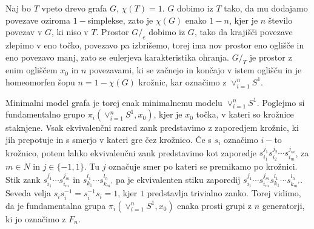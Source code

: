 \documentclass[a4paper,12pt]{article}
\theoremstyle{definition}
\theoremstyle{plain}
\theoremstyle{definition}
\theoremstyle{plain}
\theoremstyle{plain}
\theoremstyle{plain}
\theoremstyle{plain}
\begin{document}
Naj bo $T$ vpeto drevo grafa $G$, $\chi(T)=1$. $G$ dobimo iz $T$ tako, da mu dodajamo povezave 
oziroma $1-$simplekse, zato je $\chi(G)$ enako $1-n$, kjer je $n$ število povezav v $G$, ki niso v 
$T$. Prostor $G/_e$ dobimo iz $G$, tako da krajišči povezave zlepimo v eno točko, povezavo pa 
izbrišemo, torej ima nov prostor eno oglišče in eno povezavo manj, zato se eulerjeva karakteristika 
ohranja. $G/_T$ je prostor z enim ogliščem $x_0$ in $n$ povezavami, ki se začnejo in končajo v istem 
oglišču in je homeomorfen šopu $n=1-\chi(G)$ krožnic, kar označimo z $\vee_{i=1}^{n}S^1$.

Minimalni model grafa je torej enak minimalnemu modelu  $\vee_{i=1}^{n}S^1$. Poglejmo si 
fundamentalno grupo  $\pi_i(\vee_{i=1}^{n}S^1,x_0)$, kjer je $x_0$ točka, v kateri so krožnice 
staknjene. Vsak ekvivalenčni razred zank predstavimo z zaporedjem krožnic, ki jih prepotuje in s 
smerjo v kateri gre čez krožnico. Če s $s_i$ označimo $i-$to krožnico, potem lahko ekvivalenčni 
zank  predstavimo kot zaporedje $s_{i_1}^{j_1}s_{i_2}^{j_2}\cdots s_{i_m}^{j_m}$, za $m\in N$ in 
$j\in \{-1,1\}.$ Tu $j$ označuje smer po kateri se premikamo po krožnici. Stik zank 
$s_{i_1}^{j_1}\cdots s_{i_m}^{j_m}$ in $s_{k_1}^{l_1}\cdots s_{k_m'}^{l_h}$ pa je ekvivalenten 
stiku zaporedij $s_{i_1}^{j_1}\cdots s_{i_m}^{j_m}s_{k_1}^{l_1}\cdots s_{k_m'}^{l_h}$.
Seveda velja $s_i s_i^{-1}=s_i^{-1}s_i=1$, kjer $1$ predstavlja trivialno zanko. 
    Torej vidimo, da je fundamentalna grupa $\pi_i(\vee_{i=1}^{n}S^1,x_0)$ enaka prosti grupi z $n$
generatorji, ki jo označimo z $F_n$.
\end{document}
